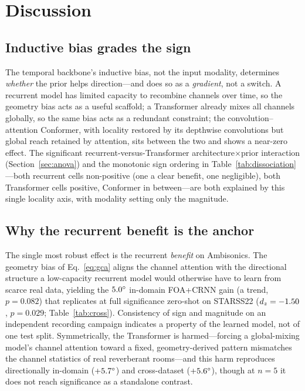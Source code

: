 \section{Discussion}
\label{sec:discussion}

\subsection{Inductive bias grades the sign}
The temporal backbone's inductive
bias, not the input modality, determines \emph{whether} the prior
helps direction---and does so as a \emph{gradient}, not a switch. A recurrent
model has limited capacity to recombine channels over time, so the
geometry bias acts as a useful scaffold; a Transformer already mixes all channels
globally, so the same bias acts as a redundant constraint; the
convolution--attention Conformer, with locality restored by its depthwise
convolutions but global reach retained by attention, sits between the two and
shows a near-zero effect. The significant recurrent-versus-Transformer
architecture$\times$prior interaction (Section~\ref{sec:anova}) and the monotonic
sign ordering in Table~\ref{tab:dissociation}---both recurrent cells non-positive
(one a clear benefit, one negligible), both Transformer cells positive, Conformer
in between---are both explained by this
single locality axis, with modality setting only the magnitude.

\subsection{Why the recurrent benefit is the anchor}
The single most robust effect is the recurrent \emph{benefit} on Ambisonics. The
geometry bias of Eq.~\eqref{eq:gca} aligns the channel attention with the
directional structure a low-capacity recurrent model would otherwise have to
learn from scarce real data, yielding the $5.0^\circ$ in-domain FOA+CRNN gain
(a trend, $p=0.082$) that replicates at full significance zero-shot on STARSS22
($d_z=-1.50$, $p=0.029$; Table~\ref{tab:cross}). Consistency of sign and magnitude
on an independent recording campaign indicates a property of the learned model,
not of one test split. Symmetrically, the
Transformer is harmed---forcing a global-mixing model's channel attention toward
a fixed, geometry-derived pattern mismatches the channel statistics of real
reverberant rooms---and this harm reproduces directionally in-domain
($+5.7^\circ$) and cross-dataset ($+5.6^\circ$), though at $n=5$ it does not
reach significance as a standalone contrast.

